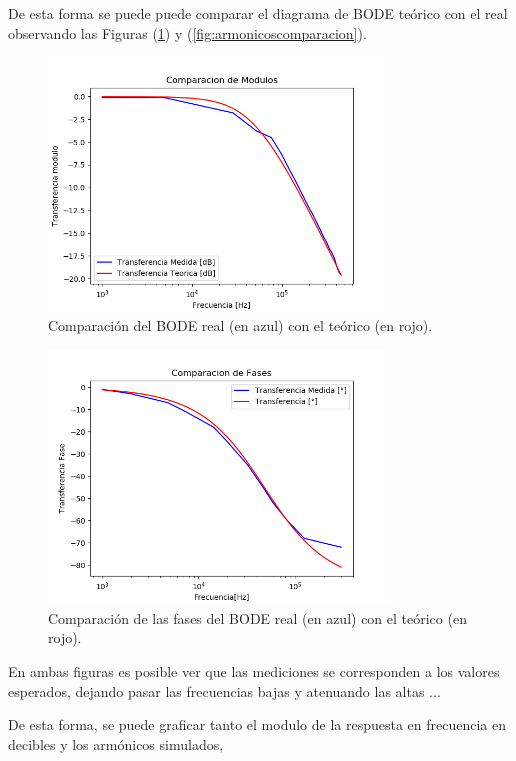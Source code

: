 \documentclass[a4paper]{article}
\begin{document}
De esta forma se puede puede comparar el diagrama de BODE teórico con el real observando las Figuras (\ref{fig:bodecomparacion}) y (\ref{fig:armonicoscomparacion}).

\begin{figure}[H]
	\centering
	\includegraphics[width=0.8\textwidth]{BodeRealVsMedido}
\caption{Comparación del BODE real (en azul) con el teórico (en rojo).}
	\label{fig:bodecomparacion}
\end{figure}

\begin{figure}[H]
	\centering
	\includegraphics[width=0.8\textwidth]{FaseRealVsMedido}
\caption{Comparación de las fases del BODE real (en azul) con el teórico (en rojo).}
	\label{fig:fasecomparacion}
\end{figure}

En ambas figuras es posible ver que las mediciones se corresponden a los valores esperados, dejando pasar las frecuencias bajas y atenuando las altas ...

De esta forma, se puede graficar tanto el modulo de la respuesta en frecuencia en decibles y los armónicos simulados,
\end{document}
